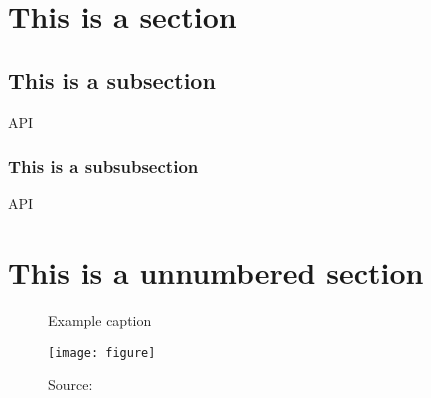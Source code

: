 \section{This is a section}
\blindtext {}
\subsection{This is a subsection}
\blindtext \ac{API}
\subsubsection{This is a subsubsection}
\blindtext \ac{API}
\section*{This is a unnumbered section}
\begin{figure}[ht] 
    \centering
    \caption{Example caption}
    \texttt{[image: figure]} 
    \caption*{\footnotesize{Source: }}
    \label{fig:goodreference}
    \end{figure}
\blindtext